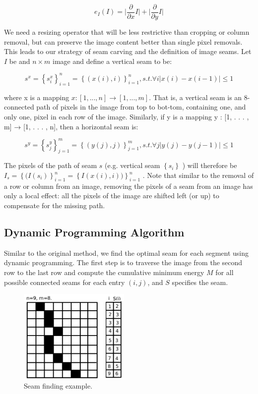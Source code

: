 \documentclass[conference]{acmsiggraph}
\begin{document}
\begin{equation}
e_I(I)=   \lvert \frac{\partial}{\partial x} I \rvert + \lvert  \frac{\partial}{\partial y} I 
\rvert 
\end{equation}

We need a resizing operator that will be less restrictive than cropping or column removal, but can preserve the image content better than single pixel removals. This leads to our strategy of seam carving and the definition of image seams. Let $I$ be and $n \times m $ image and define a vertical seam to be:

\begin{equation}
s^{x} = { \left\{ s_{i}^{x} \right\}  }_{i=1}^{n} = 
{\left\{ (x(i),i) \right\}}_{i=1}^{n} ,s.t. \forall i \lvert x(i) - x(i - 1)  \rvert \leq 1  
\end{equation}

where x is a mapping $x : [1, . . . , n] \longrightarrow [1, . . . , m]$. That is, a vertical seam is an 8-connected path of pixels in the image from top to bot-tom, containing one, and only one, pixel in each row of the image. Similarly, if y is a mapping y : [1, . . . , m] → [1, . . . , n], then a horizontal seam is:

\begin{equation}
s^{y} = { \left\{ s_{j}^{y} \right\}  }_{j=1}^{m} = 
{\left\{ (y(j),j) \right\} }_{j=1}^{m} ,s.t. \forall j \lvert y(j) - y(j - 1)  \rvert \leq 1
\end{equation} 


The pixels of the path of seam $s$ (e.g. vertical seam $\left\{ s_{i} \right\}$ ) will therefore be $I_s = {\left\{ (I(s_i) \right\} }_{i=1}^{n} = {\left\{ I (x(i),i)) \right\}}_{i=1}^{n} $  . Note that similar to the removal of a row or column from an image, removing the pixels of a seam from an image has only a local effect: all the pixels of the image are shifted left (or up) to compensate for the missing path.


\subsection{Dynamic Programming Algorithm}
Similar to the original method, we find the optimal seam for each segment using dynamic programming. The first step is to traverse the image from the second row to the last row and compute the cumulative minimum energy $M$ for all possible connected seams for each entry $(i, j)$, and $S$ specifies the seam.


\begin{figure}[ht]
  \centering
  \includegraphics[width=2.1in]{images/seam}
  \caption{ Seam finding example.}
  \label{fig:seamExample}
\end{figure}
\end{document}
